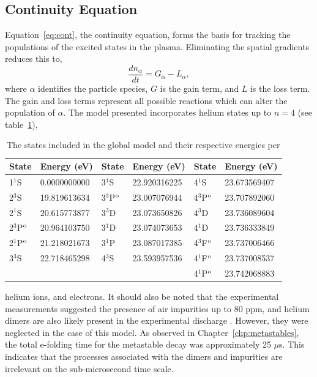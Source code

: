 \subsection{Continuity Equation}

Equation~\ref{eq:cont}, the continuity equation, forms the basis for tracking
the populations of the excited states in the plasma. Eliminating the spatial
gradients reduces this to,
\begin{equation}
  \frac{d n_\alpha}{dt} = G_\alpha - L_\alpha,
  \label{eq:zdmcont}
\end{equation}
where $\alpha$ identifies the particle species, $G$ is the gain term, and $L$ is
the loss term. The gain and loss terms represent all possible reactions which
can alter the population of $\alpha$. The model presented incorporates helium
states up to $n=4$ (see table~\ref{tbl:states}),
\begin{table}
  \centering
  \caption{The states included in the global model and their respective energies
    per \cite{Kramida2012}}
  \label{tbl:states}
  \begin{tabular}{ll|ll|ll}
    \toprule
    State        & Energy (eV)   & State       & Energy (eV)
                                                 & State        & Energy (eV)  \\
    \midrule
    1$^1$S       & 0.0000000000 & 3$^1$S       & 22.920316225  
                                                 & 4$^1$S       & 23.673569407 \\
    2$^3$S       & 19.819613634 & 3$^3$P$^\mathrm{o}$ & 23.007076944
                                                 & 4$^3$P$^\mathrm{o}$ & 23.707892060 \\
    2$^1$S       & 20.615773877 & 3$^3$D       & 23.073650826  
                                                 & 4$^3$D       & 23.736089604 \\
    2$^3$P$^\mathrm{o}$ & 20.964103750 & 3$^1$D       & 23.074073653
                                                 & 4$^1$D       & 23.736333849 \\
    2$^1$P$^\mathrm{o}$ & 21.218021673 & 3$^1$P       & 23.087017385
                                                 & 4$^3$F$^\mathrm{o}$ & 23.737006466 \\
    3$^3$S       & 22.718465298 & 4$^3$S       & 23.593957536
                                                 & 4$^1$F$^\mathrm{o}$ & 23.737008537 \\
                 &              &              &
                                                 & 4$^1$P$^\mathrm{o}$ & 23.742068883 \\

    \bottomrule
  \end{tabular}
\end{table}
helium ions, and electrons. It should also be noted that the experimental
measurements suggested the presence of air impurities up to 80 ppm, and helium
dimers are also likely present in the experimental discharge
\cite{Pouvesle1988}. However, they were neglected in the case of this model. As
observed in Chapter~\ref{chp:metastables}, the total e-folding time for the
metastable decay was approximately 25 $\mu$s. This indicates that the processes
associated with the dimers and impurities are irrelevant on the sub-microsecond
time scale.


